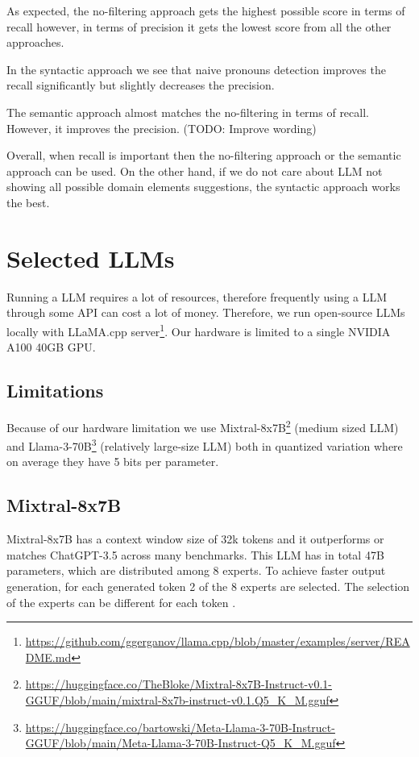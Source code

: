 As expected, the no-filtering approach gets the highest possible score in terms of recall however, in terms of precision it gets the lowest score from all the other approaches.

In the syntactic approach we see that naive pronouns detection improves the recall significantly but slightly decreases the precision.

The semantic approach almost matches the no-filtering in terms of recall. However, it improves the precision. (TODO: Improve wording)

Overall, when recall is important then the no-filtering approach or the semantic approach can be used. On the other hand, if we do not care about LLM not showing all possible domain elements suggestions, the syntactic approach works the best.


\section{Selected LLMs}

Running a LLM requires a lot of resources, therefore frequently using a LLM through some API can cost a lot of money. Therefore, we run open-source LLMs locally with LLaMA.cpp server\footnote{\url{https://github.com/ggerganov/llama.cpp/blob/master/examples/server/README.md}}. Our hardware is limited to a single NVIDIA A100 40GB GPU.

\subsection{Limitations}
Because of our hardware limitation we use Mixtral-8x7B\footnote{\url{https://huggingface.co/TheBloke/Mixtral-8x7B-Instruct-v0.1-GGUF/blob/main/mixtral-8x7b-instruct-v0.1.Q5_K_M.gguf}} (medium sized LLM) \cite{Jiang2024} and Llama-3-70B\footnote{\url{https://huggingface.co/bartowski/Meta-Llama-3-70B-Instruct-GGUF/blob/main/Meta-Llama-3-70B-Instruct-Q5_K_M.gguf}} (relatively large-size LLM) both in quantized variation where on average they have 5 bits per parameter.


\subsection{Mixtral-8x7B}
Mixtral-8x7B has a context window size of 32k tokens and it outperforms or matches ChatGPT-3.5 across many benchmarks. This LLM has in total 47B parameters, which are distributed among 8 experts. To achieve faster output generation, for each generated token 2 of the 8 experts are selected. The selection of the experts can be different for each token \cite{Jiang2024}.


